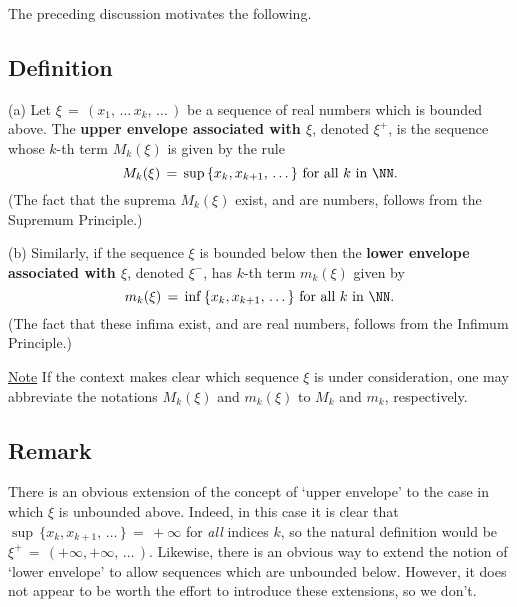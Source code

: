         The preceding discussion motivates the following.


\V

            \subsection{\small{\bf Definition}}
            \label{DefC50.40}

        (a) Let ${\xi} \,=\, (x_{1},\,{\ldots}\,x_{k},\,{\ldots}\,)$ be a sequence of real numbers which is bounded above.
    The {\bf upper envelope associated with ${\xi}$}, denoted ${\xi}^{+}$, is the sequence whose $k$-th term $M_{k}({\xi})$ is given by the rule
        \begin{displaymath}
        M_{k}({\xi}) \,=\, {\sup}\,\{x_{k},x_{k+1},\,{\ldots}\,\} \mbox{ for all $k$ in ${\NN}$}.
        \end{displaymath}
    (The fact that the suprema $M_{k}({\xi})$ exist, and are numbers, follows from the Supremum Principle.)

\V


         (b) Similarly, if the sequence ${\xi}$ is bounded below then the {\bf lower envelope associated with ${\xi}$},
    denoted ${\xi}^{-}$, has $k$-th term $m_{k}({\xi})$ given by
        \begin{displaymath}
        m_{k}({\xi}) \,=\, {\inf}\,\{x_{k},x_{k+1},\,{\ldots}\,\} \mbox{ for all $k$ in ${\NN}$}.
        \end{displaymath}
    (The fact that these infima exist, and are real numbers, follows from the Infimum Principle.)


    \underline{Note} If the context makes clear which sequence ${\xi}$ is under consideration, one may abbreviate the notations $M_{k}({\xi})$ and $m_{k}({\xi})$ to $M_{k}$ and $m_{k}$, respectively.

\V

            \subsection{\small{\bf Remark}}
            \label{RemrkC50.50}

        There is an obvious extension of the concept of `upper envelope' to the case in which ${\xi}$ is unbounded above.
    Indeed, in this case it is clear that ${\sup}\,\{x_{k},x_{k+1},\,{\ldots}\,\} \,=\, +{\infty}$ for {\em all} indices $k$, so the natural definition would be ${\xi}^{+} \,=\, (+{\infty},+{\infty},\,{\ldots}\,)$.
    Likewise, there is an obvious way to extend the notion of `lower envelope' to allow sequences which are unbounded below.
    However, it does not appear to be worth the effort to introduce these extensions, so we don't.

